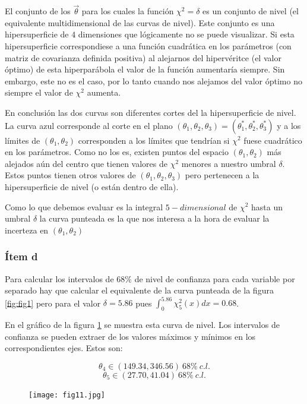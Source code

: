 El conjunto de los $\vec \theta$ para los cuales la función $\chi^2=\delta$ es un conjunto de nivel (el equivalente multidimensional de las curvas de nivel).
Este conjunto es una hipersuperficie de $4$ dimensiones que lógicamente no se puede visualizar.
Si esta hipersuperficie correspondiese a una función cuadrática en los parámetros (con matriz de covarianza definida positiva) al alejarnos del hipervéritce (el valor óptimo) de esta hiperparábola el valor de la función aumentaría siempre.
Sin embargo, este no es el caso, por lo tanto cuando nos alejamos del valor óptimo no siempre el valor de $\chi^2$ aumenta.

En conclusión las dos curvas son diferentes cortes del la hipersuperficie de nivel.
La curva azul corresponde al corte en el plano  $(\theta_1, \theta_2, \theta_3)=(\theta_1^*, \theta_2^*, \theta_3^*)$ y a los límites de $(\theta_1, \theta_2)$ corresponden a los límites que tendrían si $\chi^2$ fuese cuadrático en los parámetros.
Como no los es, existen puntos del espacio $(\theta_1, \theta_2)$ más alejados aún del centro que tienen valores de $\chi^2$ menores a nuestro umbral $\delta$.
Estos puntos tienen otros valores de $(\theta_1, \theta_2, \theta_3)$ pero pertenecen a la hipersuperficie de nivel (o están dentro de ella).

Como lo que debemos evaluar es la integral $5-dimensional$ de $\chi^2$ hasta un umbral $\delta$ la curva punteada es la que nos interesa a la hora de evaluar la incerteza en $(\theta_1, \theta_2)$

\subsubsection*{Ítem d}
Para calcular los intervalos de $68\%$ de nivel de confianza para cada variable por separado hay que calcular el equivalente de la curva punteada de la figura \ref{fig:fig1} pero para el valor $\delta=5.86$ pues $\int_0^{5.86}\chi^2_5(x)dx=0.68$.

En el gráfico de la figura \ref{fig:fig11} se muestra esta curva de nivel.
Los intervalos de confianza se pueden extraer de los valores máximos y mínimos en los correspondientes ejes.
Estos son:

$$
\theta_4 \in (149.34, 346.56)\ 68\%\ c.l.
$$
$$
\theta_5 \in (27.70, 41.04) \ 68\%\ c.l.
$$

\begin{figure}
\centering
\texttt{[image: fig11.jpg]}
\caption[]{}
\label{fig:fig11}
\end{figure}


